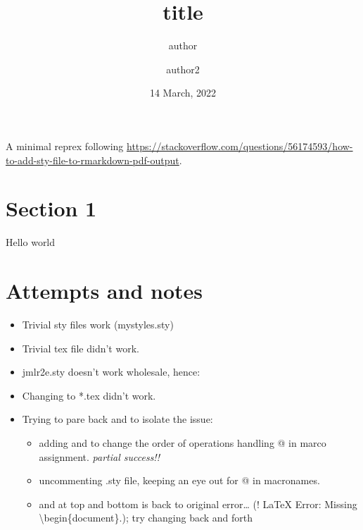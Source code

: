 \documentclass[
]{article}
\title{title}
\author{author \and author2}
\date{14 March, 2022}
\providecommand{\tightlist}{%
  \setlength{\itemsep}{0pt}\setlength{\parskip}{0pt}}
\begin{document}
\maketitle

A minimal reprex following
\url{https://stackoverflow.com/questions/56174593/how-to-add-sty-file-to-rmarkdown-pdf-output}.

\hypertarget{section-1}{%
\section{Section 1}\label{section-1}}

Hello world

\hypertarget{attempts-and-notes}{%
\section{Attempts and notes}\label{attempts-and-notes}}

\begin{itemize}
\tightlist
\item
  Trivial sty files work (mystyles.sty)
\item
  Trivial tex file didn't work.
\item
  jmlr2e.sty doesn't work wholesale, hence:
\item
  Changing to *.tex didn't work.
\item
  Trying to pare back and to isolate the issue:

  \begin{itemize}
  \tightlist
  \item
    adding \makeatletter and \makeatother to change the order of
    operations handling @ in marco assignment. \emph{partial success!!}
  \item
    uncommenting .sty file, keeping an eye out for @ in macronames.
  \item
    \makeatletter and \makeatother at top and bottom is back to original
    error\ldots{} (! LaTeX Error: Missing
    \textbackslash begin\{document\}.); try changing back and forth
  \end{itemize}
\end{itemize}
\end{document}
